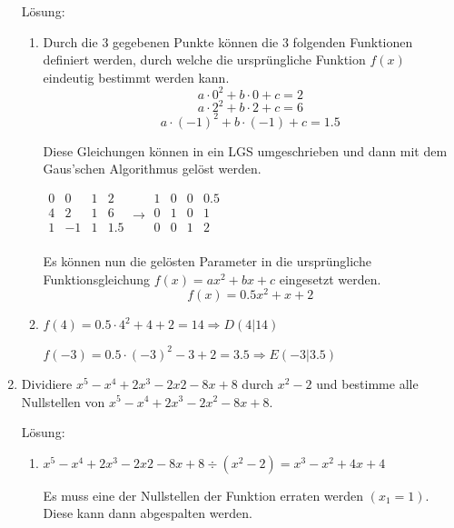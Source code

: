 \documentclass[main.tex]{subfiles}
\begin{document}
\begin{enumerate}
	      Lösung:
	      \begin{enumerate}
		      \item Durch die \( 3 \) gegebenen Punkte können die \( 3 \) folgenden Funktionen
		            definiert werden, durch welche die ursprüngliche Funktion \( f(x) \) eindeutig bestimmt werden kann.
		            \[ a \cdot 0^2 + b \cdot 0 + c = 2 \]
		            \[ a \cdot 2^2 + b \cdot 2 + c = 6 \]
		            \[ a \cdot (-1)^2 + b \cdot (-1) + c = 1.5 \]

		            Diese Gleichungen können in ein LGS umgeschrieben und dann mit dem
		            Gaus'schen Algorithmus gelöst werden.

		            \( \begin{array}{ccc|c}
			            0 & 0  & 1 & 2   \\
			            4 & 2  & 1 & 6   \\
			            1 & -1 & 1 & 1.5 \\
		            \end{array}
		            \rightarrow
		            \begin{array}{ccc|c}
			            1 & 0 & 0 & 0.5 \\
			            0 & 1 & 0 & 1   \\
			            0 & 0 & 1 & 2   \\
		            \end{array} \)

		            Es können nun die gelösten Parameter in die ursprüngliche Funktionsgleichung
		            \( f(x) = ax^2 + bx + c \) eingesetzt werden.
		            \[ f(x) = 0.5 x^2 + x + 2 \]

		      \item \( f(4) = 0.5 \cdot 4^2 + 4 + 2 = 14  \Rightarrow D(4|14) \)

		            \( f(-3) = 0.5 \cdot (-3)^2 -3 + 2 = 3.5  \Rightarrow E(-3|3.5) \)
	      \end{enumerate}
	\item Dividiere \( x^5 - x^4 + 2x^3 -2x2 -8x +8 \) durch \( x^2 - 2 \)
	      und bestimme alle Nullstellen von \( x^5 - x^4 + 2x^3 - 2x^2 - 8x +8 \).

	      Lösung:
	      \begin{enumerate}
		      \item \( x^5 - x^4 + 2x^3 -2x2 -8x +8  \div (x^2 -2) = x^3 -x^2 + 4x +4 \)

		            Es muss eine der Nullstellen der Funktion erraten werden \( (x_1=1) \).
		            Diese kann dann abgespalten werden.


\end{enumerate}
\end{enumerate}
\end{document}
